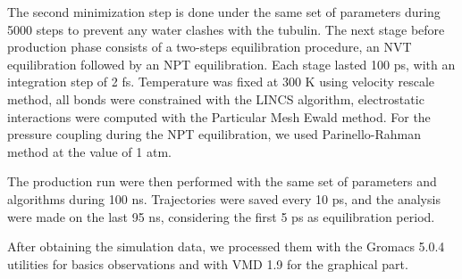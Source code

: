 \documentclass[a4paper]{article}
\begin{document}
The second minimization step is done under the same set of parameters during 5000 steps to prevent any water
clashes with the tubulin. The next stage before production phase consists of a two-steps equilibration procedure,
an NVT equilibration followed by an NPT equilibration. Each stage lasted 100 ps, with an integration step of 2 fs.
Temperature was fixed at 300 K using velocity rescale method, all bonds were constrained with the LINCS algorithm,
electrostatic interactions were computed with the Particular Mesh Ewald method. For the pressure coupling during
the NPT equilibration, we used Parinello-Rahman method at the value of 1 atm.

The production run were then performed with the same set of parameters and algorithms during 100 ns. Trajectories
were saved every 10 ps, and the analysis were made on the last 95 ns, considering the first 5 ps as equilibration
period.

After obtaining the simulation data, we processed them with the Gromacs 5.0.4 utilities for basics observations and with
VMD 1.9 for the graphical part.

\end{document}

